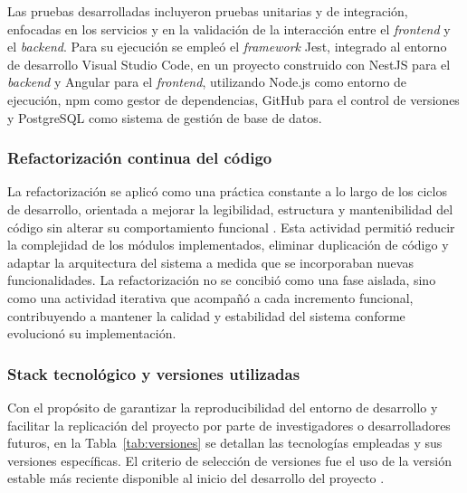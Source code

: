 Las pruebas desarrolladas incluyeron pruebas unitarias y de integración, enfocadas en los servicios y en la validación de la interacción entre el \textit{frontend} y el \textit{backend}. Para su ejecución se empleó el \textit{framework} Jest, integrado al entorno de desarrollo Visual Studio Code, en un proyecto construido con NestJS para el \textit{backend} y Angular para el \textit{frontend}, utilizando Node.js como entorno de ejecución, npm como gestor de dependencias, GitHub para el control de versiones y PostgreSQL como sistema de gestión de base de datos.

\subsubsection{Refactorización continua del código}

La refactorización se aplicó como una práctica constante a lo largo de los ciclos de desarrollo, orientada a mejorar la legibilidad, estructura y mantenibilidad del código sin alterar su comportamiento funcional \cite{beck2004xp}. Esta actividad permitió reducir la complejidad de los módulos implementados, eliminar duplicación de código y adaptar la arquitectura del sistema a medida que se incorporaban nuevas funcionalidades. La refactorización no se concibió como una fase aislada, sino como una actividad iterativa que acompañó a cada incremento funcional, contribuyendo a mantener la calidad y estabilidad del sistema conforme evolucionó su implementación.

\subsubsection{Stack tecnológico y versiones utilizadas}

Con el propósito de garantizar la reproducibilidad del entorno de desarrollo y facilitar
la replicación del proyecto por parte de investigadores o desarrolladores futuros,
en la Tabla~\ref{tab:versiones} se detallan las tecnologías empleadas y sus versiones
específicas. El criterio de selección de versiones fue el uso de la versión estable
más reciente disponible al inicio del desarrollo del proyecto \cite{dyba2008agile,beck2004xp}.

